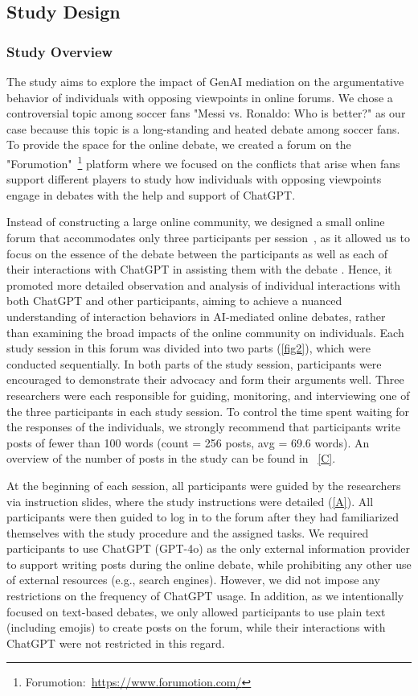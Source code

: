 \subsection{Study Design}
\subsubsection{Study Overview}

The study aims to explore the impact of GenAI mediation on the argumentative behavior of individuals with opposing viewpoints in online forums. We chose a controversial topic among soccer fans "Messi vs. Ronaldo: Who is better?" as our case because this topic is a long-standing and heated debate among soccer fans. To provide the space for the online debate, we created a forum on the "Forumotion"~\footnote{Forumotion:~\url{https://www.forumotion.com/}} platform where we focused on the conflicts that arise when fans support different players to study how individuals with opposing viewpoints engage in debates with the help and support of ChatGPT.


Instead of constructing a large online community, we designed a small online forum that accommodates only three participants per session~\cite{govers_ai-driven_2024, kim_influence_2013}, as it allowed us to focus on the essence of the debate between the participants as well as each of their interactions with ChatGPT in assisting them with the debate . Hence, it promoted more detailed observation and analysis of individual interactions with both ChatGPT and other participants, aiming to achieve a nuanced understanding of interaction behaviors in AI-mediated online debates, rather than examining the broad impacts of the online community on individuals. Each study session in this forum was divided into two parts (\autoref{fig2}), which were conducted sequentially. In both parts of the study session, participants were encouraged to demonstrate their advocacy and form their arguments well. Three researchers were each responsible for guiding, monitoring, and interviewing one of the three participants in each study session. To control the time spent waiting for the responses of the individuals, we strongly recommend that participants write posts of fewer than 100 words (count = 256 posts, avg = 69.6 words). An overview of the number of posts in the study can be found in ~\autoref{C}.

At the beginning of each session, all participants were guided by the researchers via instruction slides, where the study instructions were detailed (\autoref{A}). All participants were then guided to log in to the forum after they had familiarized themselves with the study procedure and the assigned tasks. We required participants to use ChatGPT (GPT-4o) as the only external information provider to support writing posts during the online debate, while prohibiting any other use of external resources (e.g., search engines). However, we did not impose any restrictions on the frequency of ChatGPT usage. In addition, as we intentionally focused on text-based debates, we only allowed participants to use plain text (including emojis) to create posts on the forum, while their interactions with ChatGPT were not restricted in this regard.


